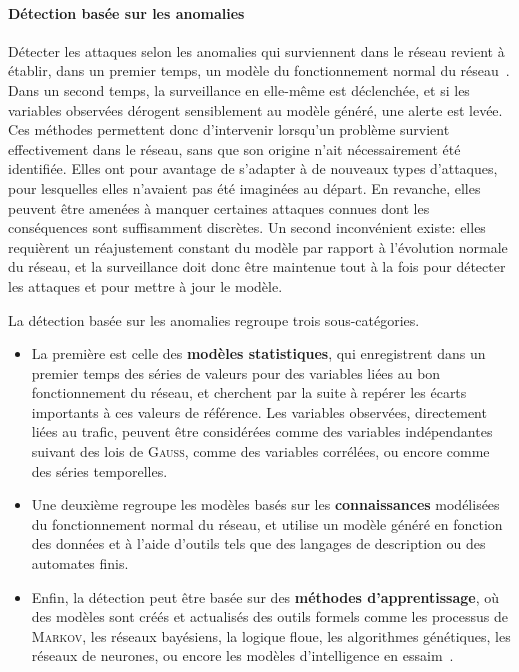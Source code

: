         \paragraph{Détection basée sur les anomalies}
Détecter les attaques selon les anomalies qui surviennent dans le réseau revient à établir, dans un premier temps, un modèle du fonctionnement normal du réseau~\cite{BMS13}.
Dans un second temps, la surveillance en elle-même est déclenchée, et si les variables observées dérogent sensiblement au modèle généré, une alerte est levée.
Ces méthodes permettent donc d'intervenir lorsqu'un problème survient effectivement dans le réseau, sans que son origine n'ait nécessairement été identifiée.
Elles ont pour avantage de s'adapter à de nouveaux types d'attaques, pour lesquelles elles n'avaient pas été imaginées au départ.
En revanche, elles peuvent être amenées à manquer certaines attaques connues dont les conséquences sont suffisamment discrètes.
Un second inconvénient existe: elles requièrent un réajustement constant du modèle par rapport à l'évolution normale du réseau, et la surveillance doit donc être maintenue tout à la fois pour détecter les attaques et pour mettre à jour le modèle.

La détection basée sur les anomalies regroupe trois sous-catégories.
\begin{itemize}
    \item La première est celle des \textbf{modèles statistiques}, qui enregistrent dans un premier temps des séries de valeurs pour des variables liées au bon fonctionnement du réseau, et cherchent par la suite à repérer les écarts importants à ces valeurs de référence. Les variables observées, directement liées au trafic, peuvent être considérées comme des variables indépendantes suivant des lois de \textsc{Gauss}, comme des variables corrélées, ou encore comme des séries temporelles.
    \item Une deuxième regroupe les modèles basés sur les \textbf{connaissances} modélisées du fonctionnement normal du réseau, et utilise un modèle généré en fonction des données et à l'aide d'outils tels que des langages de description ou des automates finis.
    \item Enfin, la détection peut être basée sur des \textbf{méthodes d'apprentissage}, où des modèles sont créés et actualisés \via des outils formels comme les processus de \textsc{Markov}, les réseaux bayésiens, la logique floue, les algorithmes génétiques, les réseaux de neurones, ou encore les modèles d'intelligence en essaim~\cite{BMS13}.
\end{itemize}

